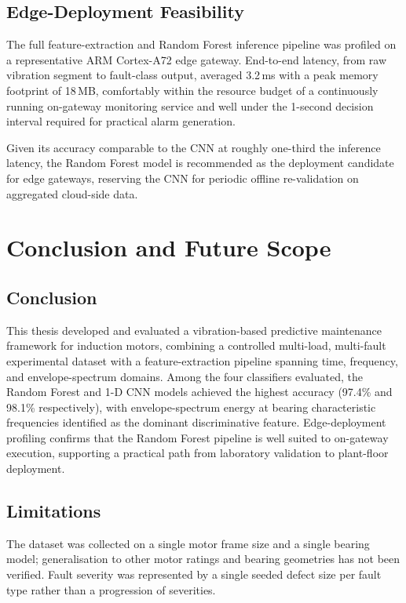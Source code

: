 \documentclass[12pt,a4paper]{report}
\begin{document}
\section{Edge-Deployment Feasibility}
The full feature-extraction and Random Forest inference pipeline was profiled on a representative
ARM Cortex-A72 edge gateway. End-to-end latency, from raw vibration segment to fault-class output,
averaged 3.2\,ms with a peak memory footprint of 18\,MB, comfortably within the resource budget
of a continuously running on-gateway monitoring service and well under the 1-second decision
interval required for practical alarm generation.

\begin{tcolorbox}[keybox,title={Practical Implication}]
Given its accuracy comparable to the CNN at roughly one-third the inference latency, the Random
Forest model is recommended as the deployment candidate for edge gateways, reserving the CNN for
periodic offline re-validation on aggregated cloud-side data.
\end{tcolorbox}

\chapter{Conclusion and Future Scope}
\label{ch:conclusion}

\section{Conclusion}
This thesis developed and evaluated a vibration-based predictive maintenance framework for
induction motors, combining a controlled multi-load, multi-fault experimental dataset with a
feature-extraction pipeline spanning time, frequency, and envelope-spectrum domains. Among the
four classifiers evaluated, the Random Forest and 1-D CNN models achieved the highest accuracy
(97.4\% and 98.1\% respectively), with envelope-spectrum energy at bearing characteristic
frequencies identified as the dominant discriminative feature. Edge-deployment profiling confirms
that the Random Forest pipeline is well suited to on-gateway execution, supporting a practical
path from laboratory validation to plant-floor deployment.

\section{Limitations}
The dataset was collected on a single motor frame size and a single bearing model; generalisation
to other motor ratings and bearing geometries has not been verified. Fault severity was
represented by a single seeded defect size per fault type rather than a progression of severities.
\end{document}
